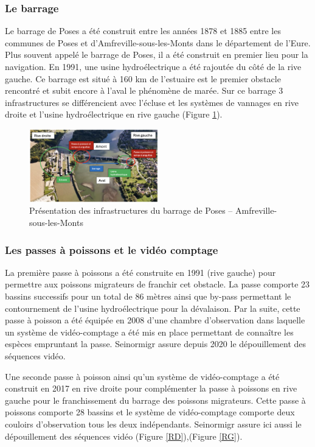 \documentclass[11pt,titlepage,twoside]{article}\usepackage[]{graphicx}\usepackage[table]{xcolor}
\begin{document}
\subsubsection{Le barrage}


Le barrage de Poses a été construit entre les années 1878 et 1885 entre les communes de Poses et d’Amfreville-sous-les-Monts dans le département de l’Eure. Plus souvent appelé le barrage de Poses, il a été construit en premier lieu pour la navigation. En 1991, une usine hydroélectrique a été rajoutée du côté de la rive gauche. Ce barrage est situé à 160 km de l’estuaire est le premier obstacle rencontré et subit encore à l’aval le phénomène de marée. Sur ce barrage 3 infrastructures se différencient avec l’écluse et les systèmes de vannages en rive droite et l’usine hydroélectrique en rive gauche (Figure \ref{Barrage}). 


\begin{figure}[htpb]
\centering
\includegraphics[width=0.5\textwidth]{Barrage}
\caption{Présentation des infrastructures du barrage de Poses – Amfreville-sous-les-Monts}
\label{Barrage}
\end{figure}

\subsubsection{Les passes à poissons et le vidéo comptage}


La première passe à poissons a été construite en 1991 (rive gauche) pour permettre aux poissons migrateurs de franchir cet obstacle. La passe comporte 23 bassins successifs pour un total de 86 mètres ainsi que by-pass permettant le contournement de l’usine hydroélectrique pour la dévalaison. Par la suite, cette passe à poisson a été équipée en 2008 d’une chambre d’observation dans laquelle un système de vidéo-comptage a été mis en place permettant de connaître les espèces empruntant la passe. Seinormigr assure depuis 2020 le dépouillement des séquences vidéo.

Une seconde passe à poisson ainsi qu’un système de vidéo-comptage a été construit en 2017 en rive droite pour complémenter la passe à poissons en rive gauche pour le franchissement du barrage des poissons migrateurs. Cette passe à poissons comporte 28 bassins et le système de vidéo-comptage comporte deux couloirs d’observation tous les deux indépendants. Seinormigr assure ici aussi le dépouillement des séquences vidéo (Figure \ref{RD}),(Figure \ref{RG}).
\end{document}
